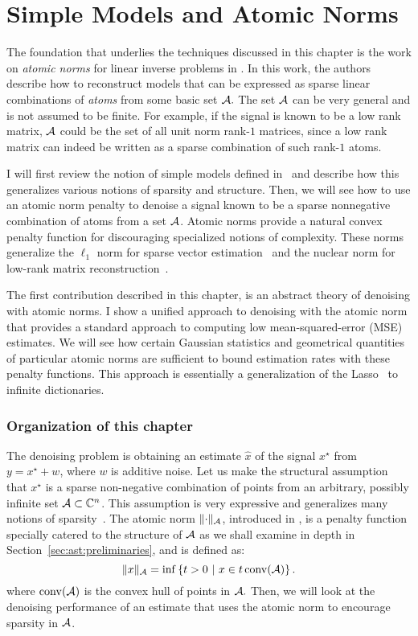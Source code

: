 \chapter{Simple Models and Atomic Norms}
\label{chap:ast}

The foundation that underlies the techniques discussed in this chapter is the
work on \emph{atomic norms} for linear inverse problems in \cite{crpw}. In this
work, the authors describe how to reconstruct models that can be expressed as
sparse linear combinations of \emph{atoms} from some basic set $\mathcal{A}.$ The set
$\mathcal{A}$ can be very general and is not assumed to be finite. For example, if the
signal is known to be a low rank matrix, $\mathcal{A}$ could be the set of all unit norm
rank-$1$ matrices, since a low rank matrix can indeed be written as a sparse
combination of such rank-$1$ atoms.

I will first review the notion of simple models defined in~\cite{crpw} and
describe how this generalizes various notions of sparsity and structure. Then, we will see how to use an atomic norm penalty to denoise a signal known to be
a sparse nonnegative combination of atoms from a set $\mathcal{A}$. Atomic norms provide
a natural convex penalty function for discouraging specialized notions of
complexity. These norms generalize the $\ell_1$ norm for sparse vector
estimation~\cite{candes06} and the nuclear norm for low-rank matrix
reconstruction~\cite{Recht10,CandesRecht09}.

The first contribution described in this chapter, is an abstract theory of
denoising with atomic norms. I show a unified approach to denoising with the
atomic norm that provides a standard approach to computing low
mean-squared-error (MSE) estimates. We will see how certain Gaussian statistics
and geometrical quantities of particular atomic norms are sufficient to bound
estimation rates with these penalty functions. This approach is essentially a
generalization of the Lasso~\cite{tibshirani96,chen98} to infinite dictionaries.

\subsection*{Organization of this chapter}

The denoising problem is obtaining an estimate $\hat{x}$ of the signal $x^\star$
from $y = x^\star + w$, where $w$ is additive noise. Let us make the structural
assumption that $x^\star$ is a sparse non-negative combination of points from an
arbitrary, possibly infinite set $\mathcal{A} \subset \mathbb{C}^n$. This assumption is very
expressive and generalizes many notions of sparsity~\cite{crpw}. The atomic norm
$\lVert\cdot\rVert_{\mathcal{A}}$, introduced in \cite{crpw}, is a penalty function specially
catered to the structure of $\mathcal{A}$ as we shall examine in depth in
Section~\ref{sec:ast:preliminaries}, and is defined as:
\begin{equation}
\label{def-atnorm}
\lVert x\rVert_{\mathcal{A}} = \inf\left\{t > 0 ~\middle|~x \in t \operatorname{conv}(\mathcal{A}) \right\}.
\end{equation}
 where $\operatorname{conv}(\mathcal{A})$ is the convex hull
of points in $\mathcal{A}.$ Then, we will look at the denoising performance of an
estimate that uses the atomic norm to encourage sparsity in $\mathcal{A}$.

